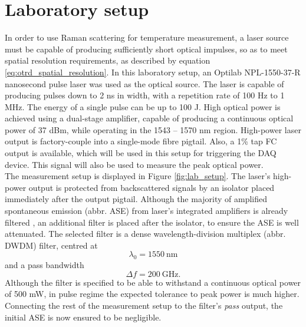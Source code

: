 \documentclass{standalone}
\begin{document}
\chapter{Laboratory setup}
\setcounter{page}\thestranica


In order to use Raman scattering for temperature measurement, a laser source must be capable of producing sufficiently short optical impulses, so as to meet spatial resolution requirements, as described by equation \ref{eq:otrd_spatial_resolution}. In this laboratory setup, an Optilab NPL-1550-37-R nanosecond pulse laser was used as the optical source. The laser is capable of producing pulses down to 2 ns in width, with a repetition rate of 100 Hz to 1 MHz. The energy of a single pulse can be up to 100 \textmu J. High optical power is achieved using a dual-stage amplifier, capable of producing a continuous optical power of 37 dBm, while operating in the 1543 -- 1570 nm region. High-power laser output is factory-couple into a single-mode fibre pigtail. Also, a 1\% tap FC output is available, which will be used in this setup for triggering the DAQ device. This signal will also be used to measure the peak optical power. \\

The measurement setup is displayed in Figure \ref{fig:lab_setup}.
The laser's high-power output is protected from backscattered signals by an isolator placed immediately after the output pigtail. Although the majority of amplified spontaneous emission (abbr. ASE) from laser's integrated amplifiers is already filtered \cite{datasheet:laser}, an additional filter is placed after the isolator, to ensure the ASE is well attenuated. The selected filter is a dense wavelength-division multiplex (abbr. DWDM) filter, centred at \cite{datasheet:dwdm_filter}
\begin{equation}
\label{eq:dwdm_filter_centre}
\lambda_0 = \SI{1550}{\nano \meter}
\end{equation} and a pass bandwidth 
\begin{equation}
\label{eq:dwdm_filter_bw}
\varDelta f = \SI{200}{\giga \hertz} \textrm{.}
\end{equation}
Although the filter is specified to be able to withstand a continuous optical power of 500 mW, in pulse regime the expected tolerance to peak power is much higher. Connecting the rest of the measurement setup to the filter's \textit{pass} output, the initial ASE is now ensured to be negligible. \\
\end{document}
